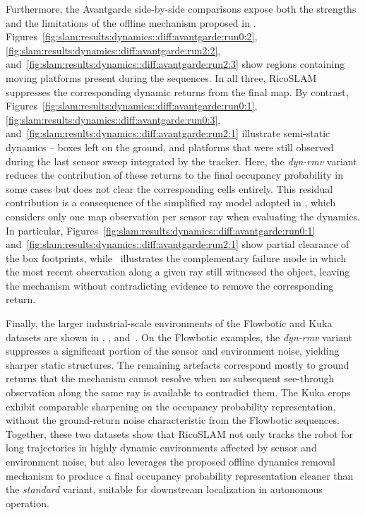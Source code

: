 Furthermore, the Avantgarde side-by-side comparisons expose both the strengths
and the limitations of the offline mechanism proposed in
.
Figures~\ref{fig:slam:results:dynamics::diff:avantgarde:run0:2},
\ref{fig:slam:results:dynamics::diff:avantgarde:run2:2},
and~\ref{fig:slam:results:dynamics::diff:avantgarde:run2:3} show
regions containing moving platforms present during the sequences.
In all three, RicoSLAM suppresses the corresponding
dynamic returns from the final map. By contrast,
Figures~\ref{fig:slam:results:dynamics::diff:avantgarde:run0:1},
\ref{fig:slam:results:dynamics::diff:avantgarde:run0:3},
and~\ref{fig:slam:results:dynamics::diff:avantgarde:run2:1}
illustrate semi-static dynamics -- boxes left on the ground, and
platforms that were still observed during the last sensor sweep
integrated by the tracker. Here, the \emph{dyn-rmv} variant reduces the
contribution of these returns to the final occupancy probability in some cases
but does not clear the corresponding cells entirely. This residual
contribution is a consequence of the simplified ray model
adopted in , which considers only
one map observation per sensor ray when evaluating the dynamics.
In particular,
Figures~\ref{fig:slam:results:dynamics::diff:avantgarde:run0:1}
and~\ref{fig:slam:results:dynamics::diff:avantgarde:run2:1} show
partial clearance of the box footprints,
while~
illustrates the complementary failure mode in which the most recent
observation along a given ray still witnessed the object, leaving the
mechanism without contradicting evidence to remove the corresponding
return.

Finally, the larger industrial-scale environments of the Flowbotic
and Kuka datasets are shown in
,
,
and~. On the Flowbotic
examples, the \emph{dyn-rmv} variant suppresses a significant portion of
the sensor and environment noise, yielding sharper static structures.
The remaining artefacts correspond mostly to ground returns that the
mechanism cannot resolve when no subsequent see-through observation
along the same ray is available to contradict them. The Kuka crops
exhibit comparable sharpening on the occupancy probability representation,
without the ground-return noise characteristic from the Flowbotic sequences.
Together, these two datasets show that
RicoSLAM not only tracks the robot for long trajectories in
highly dynamic environments affected by sensor and environment noise,
but also leverages the proposed offline dynamics removal mechanism to
produce a final occupancy probability representation cleaner than the
\emph{standard} variant, suitable for downstream localization in
autonomous operation.

